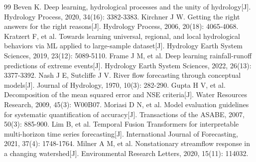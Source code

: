 \documentclass[12pt,a4paper]{article}
\begin{document}
\begin{thebibliography}{99}
 Beven K. Deep learning, hydrological processes and the unity of hydrology[J]. Hydrology Process, 2020, 34(16): 3382-3383.
 Kirchner J W. Getting the right answers for the right reasons[J]. Hydrology Process, 2006, 20(18): 4065-4068.
 Kratzert F, et al. Towards learning universal, regional, and local hydrological behaviors via ML applied to large-sample dataset[J]. Hydrology Earth System Sciences, 2019, 23(12): 5089-5110.
 Frame J M, et al. Deep learning rainfall-runoff predictions of extreme events[J]. Hydrology Earth System Sciences, 2022, 26(13): 3377-3392.
 Nash J E, Sutcliffe J V. River flow forecasting through conceptual models[J]. Journal of Hydrology, 1970, 10(3): 282-290.
 Gupta H V, et al. Decomposition of the mean squared error and NSE criteria[J]. Water Resources Research, 2009, 45(3): W00B07.
 Moriasi D N, et al. Model evaluation guidelines for systematic quantification of accuracy[J]. Transactions of the ASABE, 2007, 50(3): 885-900.
 Lim B, et al. Temporal Fusion Transformers for interpretable multi-horizon time series forecasting[J]. International Journal of Forecasting, 2021, 37(4): 1748-1764.
 Milner A M, et al. Nonstationary streamflow response in a changing watershed[J]. Environmental Research Letters, 2020, 15(11): 114032.
\end{thebibliography}
\end{document}

